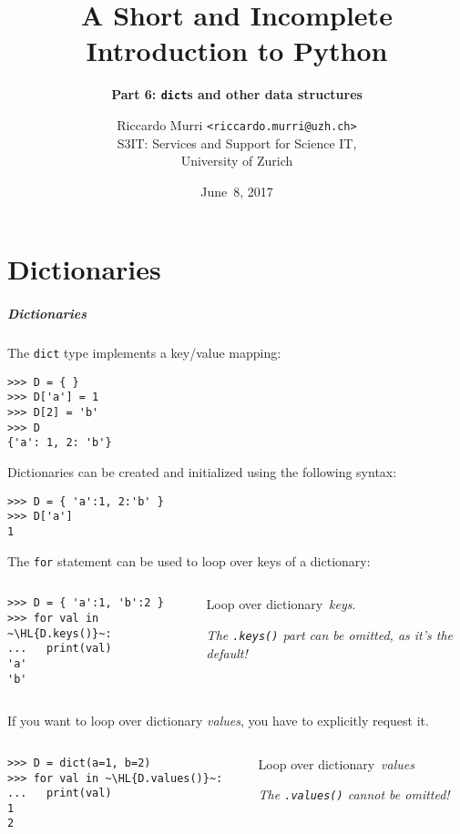 \documentclass[english,serif,mathserif,xcolor=pdftex,dvipsnames,table]{beamer}
\title[6. Dictionaries]{%
  A Short and Incomplete Introduction to Python
}
\subtitle{\bfseries Part 6: \texttt{dict}s and other data structures}
\author[R.~Murri]{%
  Riccardo Murri \texttt{<riccardo.murri@uzh.ch>}
  \\
  S3IT: Services and Support for Science IT,
  \\
  University of Zurich
}
\date{June~8, 2017}
\begin{document}
\maketitle


\part{Dictionaries}


\begin{frame}[fragile]
  \frametitle{Dictionaries}
  The \texttt{dict} type implements a key/value mapping:
\begin{lstlisting}
>>> D = { }
>>> D['a'] = 1
>>> D[2] = 'b'
>>> D
{'a': 1, 2: 'b'}
\end{lstlisting}

\+
  Dictionaries can be created and initialized using the following syntax:
\begin{lstlisting}
>>> D = { 'a':1, 2:'b' }
>>> D['a']
1
\end{lstlisting}
\end{frame}

\begin{frame}[fragile]
  The \texttt{for} statement can be used to loop over keys of a dictionary:
  \+
  \begin{columns}[c]
    \begin{column}{0.5\textwidth}
\begin{lstlisting}
>>> D = { 'a':1, 'b':2 }
>>> for val in ~\HL{D.keys()}~:
...   print(val)
'a'
'b'
\end{lstlisting}
    \end{column}
    \begin{column}{0.4\textwidth}
      \raggedleft
      Loop over dictionary~\emph{keys}.

      \emph{The \texttt{.keys()} part can be omitted, as it's the
        default!}
    \end{column}
  \end{columns}
\end{frame}

\begin{frame}[fragile]
  If you want to loop over dictionary \emph{values}, you have to
  explicitly request it.

  \+
  \begin{columns}[c]
    \begin{column}{0.5\textwidth}
\begin{lstlisting}
>>> D = dict(a=1, b=2)
>>> for val in ~\HL{D.values()}~:
...   print(val)
1
2
\end{lstlisting}
    \end{column}
    \begin{column}{0.4\textwidth}
      \raggedleft
      Loop over dictionary~\emph{values}

      \emph{The \texttt{.values()} cannot be omitted!}
    \end{column}
  \end{columns}
\end{frame}
\end{document}
